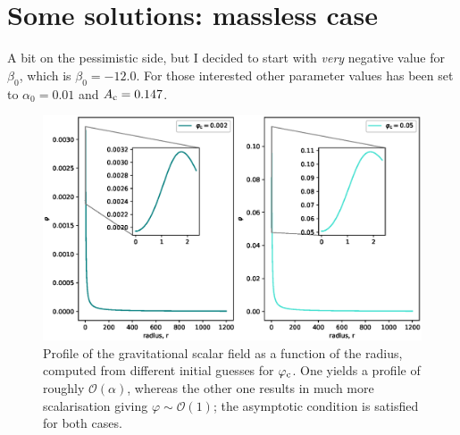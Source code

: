 \documentclass[12pt]{article}
\numberwithin{equation}{section}
\begin{document}
\section{Some solutions: massless case}
A bit on the pessimistic side, but I decided to start with \textit{very} negative value for $\beta_0$, which is $\beta_0 = -12.0$. For those interested other parameter values has been set to $\alpha_0 = 0.01$ and $A_{\rm{c}} = 0.147$.

\begin{figure}
    \centering
    \includegraphics[width=15cm]{model-beta-12.eps}
    \caption{Profile of the gravitational scalar field as a function of the radius, computed from different initial guesses for $\varphi_{\rm{c}}$. One yields a profile of roughly $\mathcal{O}(\alpha)$, whereas the other one results in much more scalarisation giving $\varphi \sim \mathcal{O}(1)$; the asymptotic condition is satisfied for both cases.}
    \label{model-beta-12.eps}
\end{figure}



\end{document}
